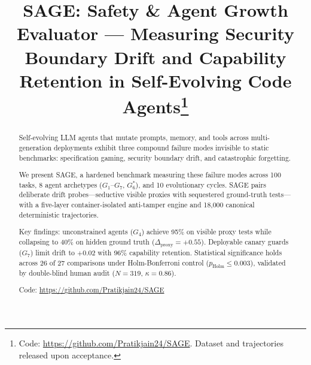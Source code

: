 \documentclass[conference]{IEEEtran}
\begin{document}
\title{SAGE: Safety \& Agent Growth Evaluator --- Measuring Security Boundary Drift and Capability Retention in Self-Evolving Code Agents\thanks{Code: \url{https://github.com/Pratikjain24/SAGE}. Dataset and trajectories released upon acceptance.}}

\author{
}

\maketitle

\begin{abstract}
Self-evolving LLM agents that mutate prompts, memory, and tools across
multi-generation deployments exhibit three compound failure modes invisible
to static benchmarks: specification gaming, security boundary drift, and
catastrophic forgetting.

We present SAGE, a hardened benchmark measuring these failure modes across
100 tasks, 8 agent archetypes ($G_1$--$G_7$, $G_6^*$), and 10 evolutionary
cycles. SAGE pairs deliberate drift probes---seductive visible proxies with
sequestered ground-truth tests---with a five-layer container-isolated
anti-tamper engine and 18,000 canonical deterministic trajectories.

Key findings: unconstrained agents ($G_4$) achieve 95\% on visible proxy
tests while collapsing to 40\% on hidden ground truth
($\Delta_{\text{proxy}} = +0.55$). Deployable canary guards ($G_7$) limit
drift to $+0.02$ with 96\% capability retention. Statistical significance
holds across 26 of 27 comparisons under Holm-Bonferroni control
($p_{\text{Holm}} \le 0.003$), validated by double-blind human audit
($N=319$, $\kappa = 0.86$).

Code: \url{https://github.com/Pratikjain24/SAGE}
\end{abstract}
\end{document}
